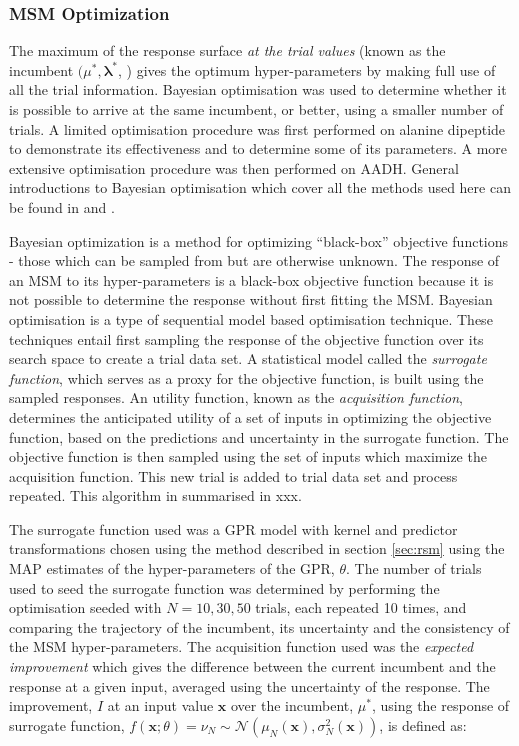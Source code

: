 \subsubsection{MSM Optimization}\label{subsec:meth_opt}
The maximum of the response surface \emph{at the trial values} (known as the incumbent $(\mu^{*}, \mathbf{\lambda}^{*}$, \cite{shahriariTakingHumanOut}) gives the optimum hyper-parameters  by making full use of all the trial information. Bayesian optimisation was used to determine whether it is possible to arrive at the same incumbent, or better, using a smaller number of trials. A limited optimisation procedure was first performed on alanine dipeptide to demonstrate its effectiveness and to determine some of its parameters. A more extensive optimisation procedure was then performed on AADH. General introductions to Bayesian optimisation which cover all the methods used here can be found in \cite{snoekPracticalBayesianOptimization} and \cite{shahriariTakingHumanOut}. 

Bayesian optimization is a method for optimizing ``black-box'' objective functions - those which can be sampled from but are otherwise unknown. The response of an MSM to its hyper-parameters is a black-box objective function because it is not possible to determine the response without first fitting the MSM. Bayesian optimisation is a type of sequential model based \cite{hutterSequentialModelbasedOptimization2011} optimisation technique. These techniques entail first sampling the response of the objective function over its search space to create a trial data set. A statistical model called the \emph{surrogate function}, which serves as a proxy for the objective function, is built using the sampled responses. An utility function, known as the \emph{acquisition function}, determines the anticipated utility of a set of inputs in optimizing the objective function, based on the predictions and uncertainty in the surrogate function.  The objective function is then sampled using the set of inputs which maximize the acquisition function. This new trial is added to trial data set and process repeated. This algorithm in summarised in xxx. 

The surrogate function used was a GPR model with kernel and predictor transformations chosen using the method described in section \ref{sec:rsm} using the MAP estimates of the hyper-parameters of the GPR, $\theta$. The number of trials used to seed the surrogate function was determined by performing the optimisation seeded with $N=10, 30, 50$ trials, each repeated 10 times, and comparing the trajectory of the incumbent, its uncertainty and the consistency of the MSM hyper-parameters. The acquisition function used was the \emph{expected improvement} which gives the difference between the current incumbent and the  response at a given input, averaged using the uncertainty of the response. The improvement, $I$ at an input value $\mathbf{x}$ over the incumbent, $\mu^{*}$, using the response of surrogate function, $f(\mathbf{x}; \theta) = \nu_{N} \sim \mathcal{N}(\mu_{N}(\mathbf{x}), \sigma_N^{2}(\mathbf{x}))$, is defined as: 

